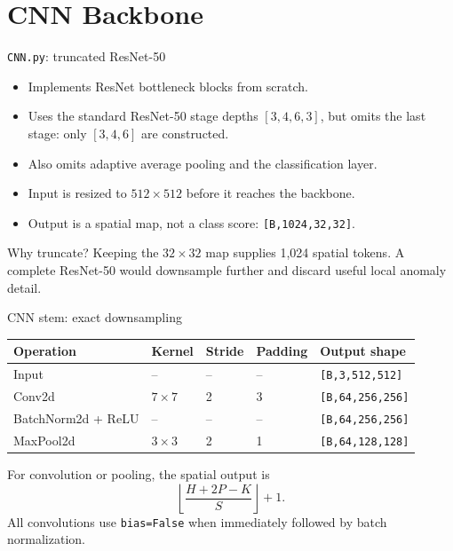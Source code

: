 \documentclass[aspectratio=169,10pt]{beamer}
\newcommand{\shape}[1]{\texttt{#1}}
\newcommand{\file}[1]{\texttt{#1}}
\newcommand{\code}[1]{\texttt{#1}}
\begin{document}
\section{CNN Backbone}

\begin{frame}{\file{CNN.py}: truncated ResNet-50}
  \begin{itemize}
    \item Implements ResNet bottleneck blocks from scratch.
    \item Uses the standard ResNet-50 stage depths $[3,4,6,3]$, but omits the
          last stage: only $[3,4,6]$ are constructed.
    \item Also omits adaptive average pooling and the classification layer.
    \item Input is resized to $512\times512$ before it reaches the backbone.
    \item Output is a spatial map, not a class score:
          \shape{[B,1024,32,32]}.
  \end{itemize}
  \begin{block}{Why truncate?}
    Keeping the $32\times32$ map supplies 1,024 spatial tokens. A complete
    ResNet-50 would downsample further and discard useful local anomaly detail.
  \end{block}
\end{frame}

\begin{frame}{CNN stem: exact downsampling}
  \centering
  \begin{tabular}{lllll}
    \toprule
    Operation & Kernel & Stride & Padding & Output shape\\
    \midrule
    Input & -- & -- & -- & \shape{[B,3,512,512]}\\
    Conv2d & $7\times7$ & 2 & 3 & \shape{[B,64,256,256]}\\
    BatchNorm2d + ReLU & -- & -- & -- & \shape{[B,64,256,256]}\\
    MaxPool2d & $3\times3$ & 2 & 1 & \shape{[B,64,128,128]}\\
    \bottomrule
  \end{tabular}
  \vspace{0.8em}
  For convolution or pooling, the spatial output is
  \[
    \left\lfloor\frac{H + 2P - K}{S}\right\rfloor + 1.
  \]
  All convolutions use \code{bias=False} when immediately followed by batch normalization.
\end{frame}
\end{document}
